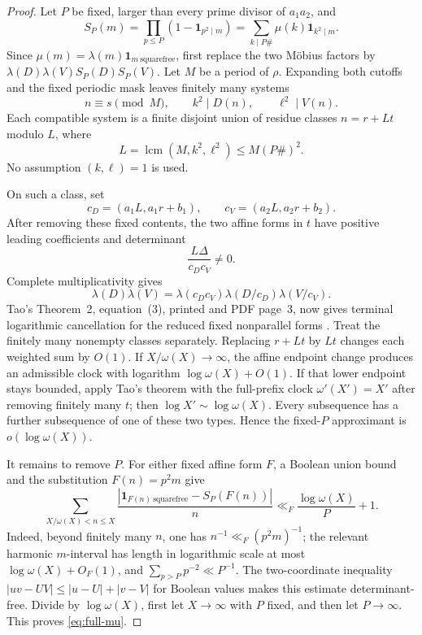 \documentclass[11pt]{article}
\theoremstyle{definition}
\theoremstyle{remark}
\newcommand{\mob}{\mu}
\newcommand{\liou}{\lambda}
\newcommand{\ind}{\mathbf 1}
\DeclareMathOperator{\lcm}{lcm}
\begin{document}
\begin{proof}
Let \(P\) be fixed, larger than every prime divisor of \(a_1a_2\), and
\[
 S_P(m)=\prod_{p\le P}(1-\ind_{p^2\mid m})
 =\sum_{k\mid P\#}\mob(k)\ind_{k^2\mid m}.
\]
Since \(\mob(m)=\liou(m)\ind_{m\ \mathrm{squarefree}}\), first replace the
two M\"obius factors by
\(\liou(D)\liou(V)S_P(D)S_P(V)\).  Let \(M\) be a period of \(\rho\).
Expanding both cutoffs and the fixed periodic mask leaves finitely many systems
\[
 n\equiv s\pmod M,\qquad k^2\mid D(n),\qquad \ell^2\mid V(n).
\]
Each compatible system is a finite disjoint union of residue classes
\(n=r+Lt\) modulo \(L\), where
\begin{equation}
 L=\lcm(M,k^2,\ell^2)\le M(P\#)^2.
 \label{eq:lcm}
\end{equation}
No assumption \((k,\ell)=1\) is used.

On such a class, set
\[
 c_D=(a_1L,a_1r+b_1),\qquad c_V=(a_2L,a_2r+b_2).
\]
After removing these fixed contents, the two affine forms in \(t\) have
positive leading coefficients and determinant
\begin{equation}
 \frac{L\Delta}{c_Dc_V}\ne0.
 \label{eq:reduced-det}
\end{equation}
Complete multiplicativity gives
\[
 \liou(D)\liou(V)=\liou(c_Dc_V)
 \liou(D/c_D)\liou(V/c_V).
\]
Tao's Theorem~2, equation~(3), printed and PDF page~3, now gives terminal
logarithmic cancellation for the reduced fixed nonparallel forms
\cite{Tao2016LogChowla}.  Treat the finitely many nonempty classes
separately.  Replacing \(r+Lt\) by \(Lt\) changes each weighted sum by
\(O(1)\).  If \(X/\omega(X)\to\infty\), the affine endpoint change produces
an admissible clock with logarithm \(\log\omega(X)+O(1)\).  If that lower
endpoint stays bounded, apply Tao's theorem with the full-prefix clock
\(\omega'(X')=X'\) after removing finitely many \(t\); then
\(\log X'\sim\log\omega(X)\).  Every subsequence has a further subsequence
of one of these two types.  Hence the fixed-\(P\) approximant is
\(o(\log\omega(X))\).

It remains to remove \(P\).  For either fixed affine form \(F\), a Boolean
union bound and the substitution \(F(n)=p^2m\) give
\begin{equation}
 \sum_{X/\omega(X)<n\le X}
 \frac{|\ind_{F(n)\ \mathrm{squarefree}}-S_P(F(n))|}{n}
 \ll_F \frac{\log\omega(X)}P+1.
 \label{eq:tail}
\end{equation}
Indeed, beyond finitely many \(n\), one has
\(n^{-1}\ll_F(p^2m)^{-1}\); the relevant harmonic \(m\)-interval has
length in logarithmic scale at most \(\log\omega(X)+O_F(1)\), and
\(\sum_{p>P}p^{-2}\ll P^{-1}\).  The two-coordinate inequality
\(|uv-UV|\le|u-U|+|v-V|\) for Boolean values makes this estimate
determinant-free.  Divide by \(\log\omega(X)\), first let \(X\to\infty\)
with \(P\) fixed, and then let \(P\to\infty\).  This proves
\eqref{eq:full-mu}.
\end{proof}
\end{document}
